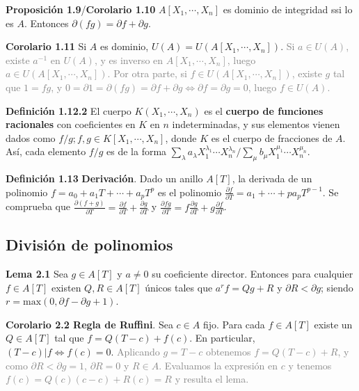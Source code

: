 \documentclass[a4paper, 11pt]{extarticle}
\newcommand{\propo}[1]{\textcolor{rojo}{\textbf{Proposición #1}}}
\newcommand{\defi}[1]{\textcolor{azul}{\textbf{Definición #1}}}
\newcommand{\lema}[1]{\textcolor{rosa}{\textbf{Lema #1}}}
\newcommand{\cor}[1]{\textcolor{rosa}{\textbf{Corolario #1}}}
\begin{document}
{{\propo{1.9}/\cor{1.10} \(A[X_1, \cdots, X_n]\) es dominio de integridad ssi lo
es \(A\). Entonces \(\partial(fg) = \partial f + \partial g\).

\cor{1.11} Si \(A\) es dominio, \(U(A) = U( A[X_1, \cdots, X_n])\). 
\textcolor{gray}{\footnotesize Si \( a \in U(A)\), existe \( a^{-1} \) en \( U(A) \),
 y es inverso en \(  A[X_1, \cdots, X_n] \), luego \( a \in U( A[X_1, \cdots, X_n]) \). 
 Por otra parte, si \( f \in U(A[X_1, \cdots, X_n]) \), existe \( g \) tal que \( 1 = fg \), y 
\(0 = \partial1 = \partial(fg) = \partial f+ \partial g \iff \partial f = \partial g = 0\), luego \( f \in U(A)  \).}

\defi{1.12.2} El cuerpo \(K(X_1, \cdots, X_n)\) es el \textbf{cuerpo de funciones 
racionales} con coeficientes en \(K\) en \(n\) indeterminadas, y sus
elementos vienen dados como \(f / g; f,g \in K[X_1, \cdots, X_n]\), donde \(K\) es el cuerpo de fracciones de \(A\). Así, cada elemento \(f/g\) es de la
forma \(\sum _{\lambda}^{}a_\lambda X_1^{\lambda_1} \cdots X_n^{\lambda_n} /
\sum _{\mu}^{}b_\mu X_1^{\mu_1} \cdots X_n^{\mu_n}\).

\defi{1.13} \textbf{Derivación}. Dado un anillo \(A[T]\), la derivada de un polinomio
\(f = a_0 + a_1T + \cdots + a_p T^p\) es el polinomio \(\frac{\partial
f}{\partial T}= a_1 + \cdots + pa_pT^{p-1}\). Se comprueba que \(\frac{\partial
(f+g)}{\partial T} = \frac{\partial f}{\partial T} + \frac{\partial g}{\partial
T}\) y \(\frac{\partial fg}{\partial T} = f \frac{\partial g}{\partial T} + g
\frac{\partial f}{\partial T}\). 

\subsection*{División de polinomios}
\label{sec:orgc6916da}
\lema{2.1} Sea \(g \in A[T]\) y \(a \neq 0\) su coeficiente director.
Entonces para cualquier \(f \in A[T]\) existen \(Q, R \in A[T]\) únicos tales que
\(a^rf = Qg + R\) y \(\partial R < \partial g\); siendo \(r = \text{max}(0,
\partial f - \partial g + 1)\).

\cor{2.2 Regla de Ruffini}. Sea \(c \in A\) fijo. Para cada \(f \in A[T]\)
existe un \(Q \in A[T]\) tal que \(f = Q(T-c) + f(c)\). En particular, \((T-c)|f \iff f(c) = 0\). 
\textcolor{gray}{\footnotesize Aplicando \( g = T-c \) obtenemos \( f = Q(T-c) + 
R \), y como \( \partial R < \partial g = 1 \), \( \partial R = 0 \) y \( R \in A \). Evaluamos la expresión en 
\( c \) y tenemos \( f(c) = Q(c)(c-c) + R(c) = R \) y resulta el lema.}

}}
\end{document}
